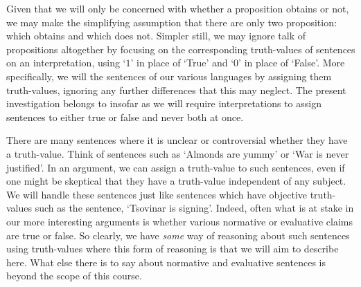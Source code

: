 Given that we will only be concerned with whether a proposition obtains or not, we may make the simplifying assumption that there are only two proposition:  which obtains and  which does not.
Simpler still, we may ignore talk of propositions altogether by focusing on the corresponding truth-values of sentences on an interpretation, using `$1$' in place of `True' and `$0$' in place of `False'.
More specifically, we will  the sentences of our various languages by assigning them truth-values, ignoring any further differences that this may neglect.
The present investigation belongs to  insofar as we will require interpretations to assign sentences to either true or false and never both at once.




There are many sentences where it is unclear or controversial whether they have a truth-value.
Think of sentences such as `Almonds are yummy' or `War is never justified'.
In an argument, we can assign a truth-value to such sentences, even if one might be skeptical that they have a truth-value independent of any subject.
We will handle these sentences just like sentences which have objective truth-values such as the sentence, `Tsovinar is signing'.
Indeed, often what is at stake in our more interesting arguments is whether various normative or evaluative claims are true or false.
So clearly, we have \textit{some} way of reasoning about such sentences using truth-values where this form of reasoning is that we will aim to describe here.
What else there is to say about normative and evaluative sentences is beyond the scope of this course.

